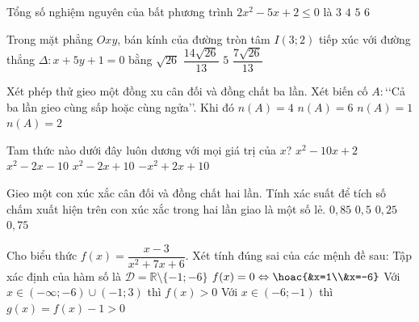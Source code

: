 \begin{ex}%
	Tổng số nghiệm nguyên của bất phương trình $2x^2-5x+2\le 0$ là
	\choice
	{\True $3$}
	{$4$}
	{$5$}
	{$6$}
	\loigiai{
		
	}
\end{ex}

\begin{ex} %
	Trong mặt phẳng $Oxy$, bán kính của đường tròn tâm $I(3;2)$ tiếp xúc với đường thẳng $\Delta\colon x+5y+1=0$ bằng
	\choice
	{$\sqrt{26}$}
	{$\dfrac{14\sqrt{26}}{13}$}
	{$5$}
	{\True $\dfrac{7\sqrt{26}}{13}$}
	\loigiai{
	
	}
\end{ex}

\begin{ex}%
	Xét phép thử gieo một đồng xu cân đối và đồng chất ba lần. Xét biến cố $A\colon$\lq\lq Cả ba lần gieo cùng sấp hoặc cùng ngửa\rq\rq. Khi đó
	\choice
	{$n(A)=4$}
	{$n(A)=6$}
	{$n(A)=1$}
	{\True $n(A)=2$}
	\loigiai{
	
	}
\end{ex}
\begin{ex} %
	Tam thức nào dưới đây luôn dương với mọi giá trị của $x$?
	\choice
	{$x^2-10x+2$}
	{$x^2-2x-10$}
	{\True $x^2-2x+10$}
	{$-x^2+2x+10$}
	\loigiai{
		
	}
\end{ex}

\begin{ex}%
	Gieo một con xúc xắc cân đối và đồng chất hai lần. Tính xác suất để tích số chấm xuất hiện trên con xúc xắc trong hai lần giao là một số lẻ.
	\choice
	{$0{,}85$}
	{$0{,}5$}
	{\True $0{,}25$}
	{$0{,}75$}
	\loigiai{
	
	}
\end{ex}

\cauds

\begin{ex} %
	Cho biểu thức $f(x)=\dfrac{x-3}{x^2+7x+6}$. Xét tính đúng sai của các mệnh đề sau:
	\choiceTF
	{\True Tập xác định của hàm số là $\mathscr{D}=\mathbb{R}\setminus \{-1;-6\}$}
	{$f(x)=0\Leftrightarrow\hoac{&x=1\\&x=-6}$}
	{Với $x\in (-\infty;-6)\cup (-1;3)$ thì $f(x)>0$}
	{Với $x\in (-6;-1)$ thì $g(x)=f(x)-1>0$}
	\loigiai{
		
	}
\end{ex}

